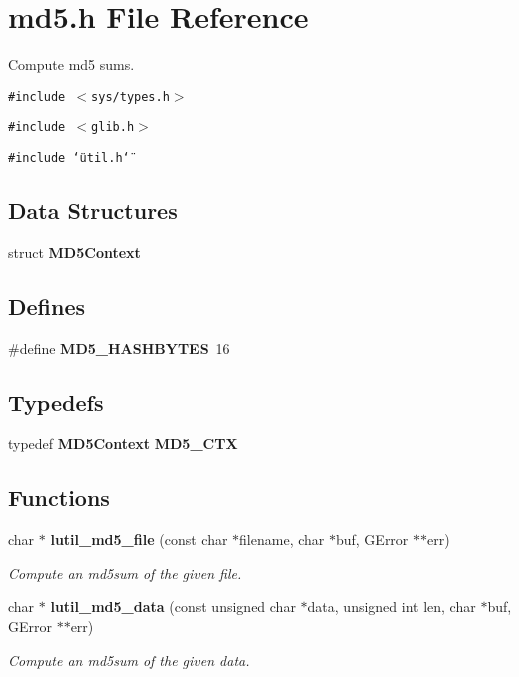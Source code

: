 \section{md5.h File Reference}
\label{md5_8h}
Compute md5 sums.  


{\tt \#include $<$sys/types.h$>$}\par
{\tt \#include $<$glib.h$>$}\par
{\tt \#include \char`\"{}util.h\char`\"{}}\par
\subsection*{Data Structures}
\begin{CompactItemize}
\item 
struct {\bf MD5Context}
\end{CompactItemize}
\subsection*{Defines}
\begin{CompactItemize}
\item 
\#define {\bf MD5\_\-HASHBYTES}\ 16
\end{CompactItemize}
\subsection*{Typedefs}
\begin{CompactItemize}
\item 
typedef {\bf MD5Context} {\bf MD5\_\-CTX}
\end{CompactItemize}
\subsection*{Functions}
\begin{CompactItemize}
\item 
char $\ast$ {\bf lutil\_\-md5\_\-file} (const char $\ast$filename, char $\ast$buf, GError $\ast$$\ast$err)
\begin{CompactList}\small\item\em Compute an md5sum of the given file. \item\end{CompactList}\item 
char $\ast$ {\bf lutil\_\-md5\_\-data} (const unsigned char $\ast$data, unsigned int len, char $\ast$buf, GError $\ast$$\ast$err)
\begin{CompactList}\small\item\em Compute an md5sum of the given data. \item\end{CompactList}\end{CompactItemize}


